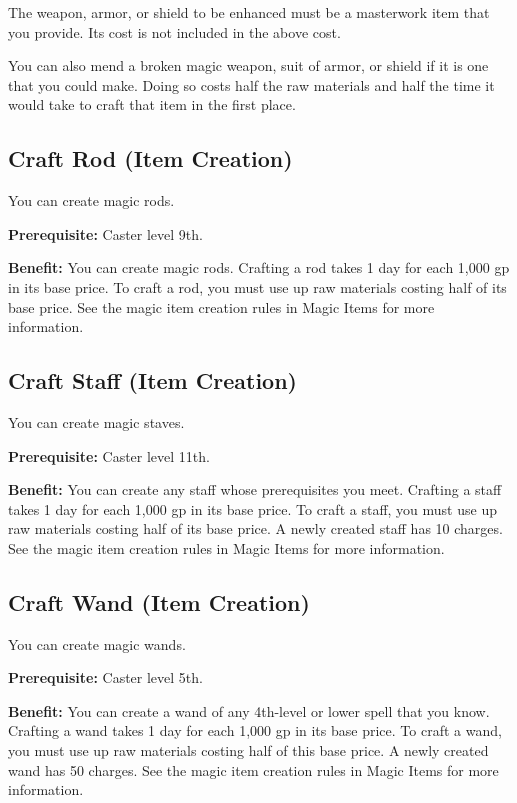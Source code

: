 The weapon, armor, or shield to be enhanced must be a masterwork item that you provide. Its cost is not included in the above cost.

You can also mend a broken magic weapon, suit of armor, or shield if it is one that you could make. Doing so costs half the raw materials and half the time it would take to craft that item in the first place.
				
\subsection{Craft Rod (Item Creation)}

				
You can create magic rods.
				
\textbf{Prerequisite:} Caster level 9th.
				
\textbf{Benefit:} You can create magic rods. Crafting a rod takes 1 day for each 1,000 gp in its base price. To craft a rod, you must use up raw materials costing half of its base price. See the magic item creation rules in Magic Items for more information.
				
\subsection{Craft Staff (Item Creation)}

				
You can create magic staves.
				
\textbf{Prerequisite:} Caster level 11th.
				
\textbf{Benefit:} You can create any staff whose prerequisites you meet. Crafting a staff takes 1 day for each 1,000 gp in its base price. To craft a staff, you must use up raw materials costing half of its base price. A newly created staff has 10 charges. See the magic item creation rules in Magic Items for more information.
				
\subsection{Craft Wand (Item Creation)}

				
You can create magic wands.
				
\textbf{Prerequisite:} Caster level 5th.
				
\textbf{Benefit:} You can create a wand of any 4th-level or lower spell that you know. Crafting a wand takes 1 day for each 1,000 gp in its base price. To craft a wand, you must use up raw materials costing half of this base price. A newly created wand has 50 charges. See the magic item creation rules in Magic Items for more information.
				
